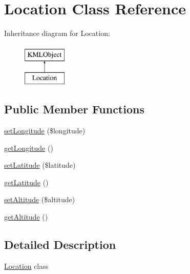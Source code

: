 \hypertarget{classLocation}{
\section{Location Class Reference}
\label{da/d05/classLocation}
}
Inheritance diagram for Location:\begin{figure}[H]
\begin{center}
\leavevmode
\includegraphics[height=2.000000cm]{da/d05/classLocation}
\end{center}
\end{figure}
\subsection*{Public Member Functions}
\begin{DoxyCompactItemize}
\item 
\hyperlink{classLocation_a34d7c4f687bc0d6ca93c66eb175b9440}{setLongitude} (\$longitude)
\item 
\hyperlink{classLocation_a45da111eb0e74b971be4fd7b9b81cbe0}{getLongitude} ()
\item 
\hyperlink{classLocation_af265eca82d086cd13e54b1aa9fd54fb0}{setLatitude} (\$latitude)
\item 
\hyperlink{classLocation_a5854c767a86eddf672e53d08f4d58847}{getLatitude} ()
\item 
\hyperlink{classLocation_a3d99490a8b5f5ed98c31a6d48418abdd}{setAltitude} (\$altitude)
\item 
\hyperlink{classLocation_a1e7840644ed015ab273b25c50145c172}{getAltitude} ()
\end{DoxyCompactItemize}


\subsection{Detailed Description}
\hyperlink{classLocation}{Location} class 

